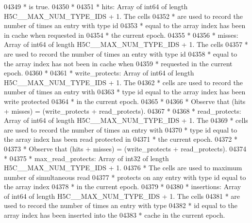 \begin{DoxyCode}
04349 \textcolor{comment}{ * is true.}
04350 \textcolor{comment}{ *}
04351 \textcolor{comment}{ * hits:        Array of int64 of length H5C\_\_MAX\_NUM\_TYPE\_IDS + 1.  The cells}
04352 \textcolor{comment}{ *      are used to record the number of times an entry with type id}
04353 \textcolor{comment}{ *      equal to the array index has been in cache when requested in}
04354 \textcolor{comment}{ *      the current epoch.}
04355 \textcolor{comment}{ *}
04356 \textcolor{comment}{ * misses:      Array of int64 of length H5C\_\_MAX\_NUM\_TYPE\_IDS + 1.  The cells}
04357 \textcolor{comment}{ *      are used to record the number of times an entry with type id}
04358 \textcolor{comment}{ *      equal to the array index has not been in cache when}
04359 \textcolor{comment}{ *      requested in the current epoch.}
04360 \textcolor{comment}{ *}
04361 \textcolor{comment}{ * write\_protects:  Array of int64 of length H5C\_\_MAX\_NUM\_TYPE\_IDS + 1.  The}
04362 \textcolor{comment}{ *      cells are used to record the number of times an entry with}
04363 \textcolor{comment}{ *      type id equal to the array index has been write protected}
04364 \textcolor{comment}{ *      in the current epoch.}
04365 \textcolor{comment}{ *}
04366 \textcolor{comment}{ *      Observe that (hits + misses) = (write\_protects + read\_protects).}
04367 \textcolor{comment}{ *}
04368 \textcolor{comment}{ * read\_protects: Array of int64 of length H5C\_\_MAX\_NUM\_TYPE\_IDS + 1.  The}
04369 \textcolor{comment}{ *      cells are used to record the number of times an entry with}
04370 \textcolor{comment}{ *      type id equal to the array index has been read protected in}
04371 \textcolor{comment}{ *      the current epoch.}
04372 \textcolor{comment}{ *}
04373 \textcolor{comment}{ *              Observe that (hits + misses) = (write\_protects + read\_protects).}
04374 \textcolor{comment}{ *}
04375 \textcolor{comment}{ * max\_read\_protects:  Array of int32 of length H5C\_\_MAX\_NUM\_TYPE\_IDS + 1.}
04376 \textcolor{comment}{ *      The cells are used to maximum number of simultaneous read}
04377 \textcolor{comment}{ *      protects on any entry with type id equal to the array index}
04378 \textcolor{comment}{ *      in the current epoch.}
04379 \textcolor{comment}{ *}
04380 \textcolor{comment}{ * insertions:  Array of int64 of length H5C\_\_MAX\_NUM\_TYPE\_IDS + 1.  The cells}
04381 \textcolor{comment}{ *      are used to record the number of times an entry with type}
04382 \textcolor{comment}{ *      id equal to the array index has been inserted into the}
04383 \textcolor{comment}{ *      cache in the current epoch.}

\end{DoxyCode}
